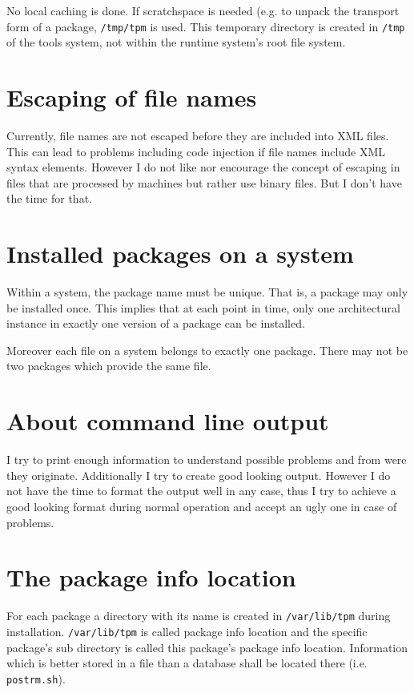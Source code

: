 \documentclass[a4paper]{article}
\newcommand{\file}[1]{\texttt{#1}}
\begin{document}
	No local caching is done. If scratchspace is needed (e.g. to unpack the transport form of a package, \file{/tmp/tpm} is used. This temporary directory is created in \file{/tmp} of the tools system, not within the runtime system's root file system.
	
	\section{Escaping of file names}
	\label{sec:escaping_of_file_names}
	
	Currently, file names are not escaped before they are included into XML files. This can lead to problems including code injection if file names include XML syntax elements. However I do not like nor encourage the concept of escaping in files that are processed by machines but rather use binary files. But I don't have the time for that.
	
	\section{Installed packages on a system}
	\label{sec:installed_packages_on_a_system}
	
	Within a system, the package name must be unique. That is, a package may only be installed once. This implies that at each point in time, only one architectural instance in exactly one version of a package can be installed.
	
	Moreover each file on a system belongs to exactly one package. There may not be two packages which provide the same file.
	
	\section{About command line output}
	\label{sec:about_command_line_output}
	
	I try to print enough information to understand possible problems and from were they originate. Additionally I try to create good looking output. However I do not have the time to format the output well in any case, thus I try to achieve a good looking format during normal operation and accept an ugly one in case of problems.
	
	\section{The package info location}
	\label{sec:the_package_info_location}
	
	For each package a directory with its name is created in \file{/var/lib/tpm} during installation. \file{/var/lib/tpm} is called package info location and the specific package's sub directory is called this package's package info location. Information which is better stored in a file than a database shall be located there (i.e. \file{postrm.sh}).
	
\end{document}
